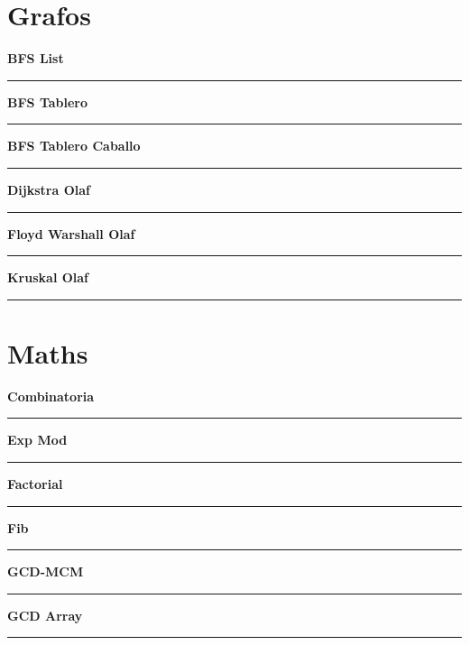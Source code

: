 \documentclass[a4paper, 12pt]{article}
\begin{document}
	\section{Grafos}
	    \begin{center}{\Large\bf BFS List}\\\noindent\rule{8cm}{0.4pt}\end{center}
		
		\begin{center}{\Large\bf BFS Tablero}\\\noindent\rule{8cm}{0.4pt}\end{center}
		
		\begin{center}{\Large\bf BFS Tablero Caballo}\\\noindent\rule{8cm}{0.4pt}\end{center}
		
		\begin{center}{\Large\bf Dijkstra Olaf}\\\noindent\rule{8cm}{0.4pt}\end{center}
		
		\begin{center}{\Large\bf Floyd Warshall Olaf}\\\noindent\rule{8cm}{0.4pt}\end{center}
		
		\begin{center}{\Large\bf Kruskal Olaf}\\\noindent\rule{8cm}{0.4pt}\end{center}
		
		\newpage
	\section{Maths}
		\begin{center}{\Large\bf Combinatoria}\\\noindent\rule{8cm}{0.4pt}\end{center}
		
		\begin{center}{\Large\bf Exp Mod}\\\noindent\rule{8cm}{0.4pt}\end{center}
		
		\begin{center}{\Large\bf Factorial}\\\noindent\rule{8cm}{0.4pt}\end{center}
		
		\begin{center}{\Large\bf Fib}\\\noindent\rule{8cm}{0.4pt}\end{center}
		
		\begin{center}{\Large\bf GCD-MCM}\\\noindent\rule{8cm}{0.4pt}\end{center}
		
		\begin{center}{\Large\bf GCD Array}\\\noindent\rule{8cm}{0.4pt}\end{center}
		
		\newpage
\end{document}
